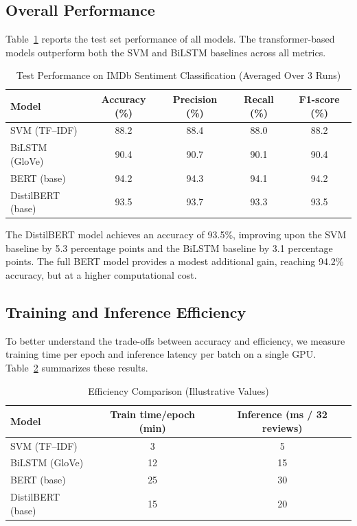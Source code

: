 \documentclass[conference]{IEEEtran}
\begin{document}
\subsection{Overall Performance}
Table~\ref{tab:results_overall} reports the test set performance of all models. The transformer-based models outperform both the SVM and BiLSTM baselines across all metrics.

\begin{table}[htbp]
\caption{Test Performance on IMDb Sentiment Classification (Averaged Over 3 Runs)}
\label{tab:results_overall}
\centering
\begin{tabular}{lcccc}
\toprule
\textbf{Model} & \textbf{Accuracy (\%)} & \textbf{Precision (\%)} & \textbf{Recall (\%)} & \textbf{F1-score (\%)} \\
\midrule
SVM (TF--IDF) & 88.2 & 88.4 & 88.0 & 88.2 \\
BiLSTM (GloVe) & 90.4 & 90.7 & 90.1 & 90.4 \\
BERT (base) & 94.2 & 94.3 & 94.1 & 94.2 \\
DistilBERT (base) & 93.5 & 93.7 & 93.3 & 93.5 \\
\bottomrule
\end{tabular}
\end{table}

The DistilBERT model achieves an accuracy of 93.5\%, improving upon the SVM baseline by 5.3 percentage points and the BiLSTM baseline by 3.1 percentage points. The full BERT model provides a modest additional gain, reaching 94.2\% accuracy, but at a higher computational cost.

\subsection{Training and Inference Efficiency}
To better understand the trade-offs between accuracy and efficiency, we measure training time per epoch and inference latency per batch on a single GPU. Table~\ref{tab:efficiency} summarizes these results.

\begin{table}[htbp]
\caption{Efficiency Comparison (Illustrative Values)}
\label{tab:efficiency}
\centering
\begin{tabular}{lcc}
\toprule
\textbf{Model} & \textbf{Train time/epoch (min)} & \textbf{Inference (ms / 32 reviews)} \\
\midrule
SVM (TF--IDF) & 3 & 5 \\
BiLSTM (GloVe) & 12 & 15 \\
BERT (base) & 25 & 30 \\
DistilBERT (base) & 15 & 20 \\
\bottomrule
\end{tabular}
\end{table}
\end{document}
